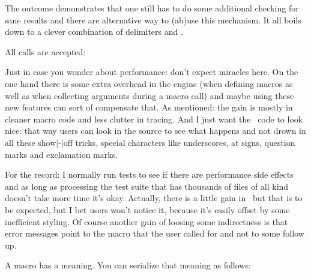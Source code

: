 \startbuffer[definition]
\tolerant{}
\stopbuffer

\typebuffer[definition][option=TEX] \getbuffer[definition]

\startbuffer[example]
\dontleavehmode \foo[a=1]
\dontleavehmode \foo[b=]
\dontleavehmode \foo[=]
\dontleavehmode \foo[x]\ignorearguments
\stopbuffer

The outcome demonstrates that one still has to do some additional checking for sane
results and there are alternative way to (ab)use this mechanism. It all boils down
to a clever combination of delimiters and \type {\ignorearguments}.

\typebuffer[example][option=TEX]

All calls are accepted:

\startlines \getbuffer[example] \stoplines

Just in case you wonder about performance: don't expect miracles here. On the one
hand there is some extra overhead in the engine (when defining macros as well as
when collecting arguments during a macro call) and maybe using these new features
can sort of compensate that. As mentioned: the gain is mostly in cleaner macro
code and less clutter in tracing. And I just want the \CONTEXT\ code to look
nice: that way users can look in the source to see what happens and not drown in
all these show|-|off tricks, special characters like underscores, at signs,
question marks and exclamation marks.

For the record: I normally run tests to see if there are performance side effects
and as long as processing the test suite that has thousands of files of all kind
doesn't take more time it's okay. Actually, there is a little gain in \CONTEXT\
but that is to be expected, but I bet users won't notice it, because it's easily
offset by some inefficient styling. Of course another gain of loosing some
indirectness is that error messages point to the macro that the user called for
and not to some follow up.

\stopsectionlevel

\startsectionlevel[title=Introspection]

A macro has a meaning. You can serialize that meaning as follows:

\startbuffer[definition]
\tolerant\protected{}

\meaning\foo
\stopbuffer

\typebuffer[definition][option=TEX]

